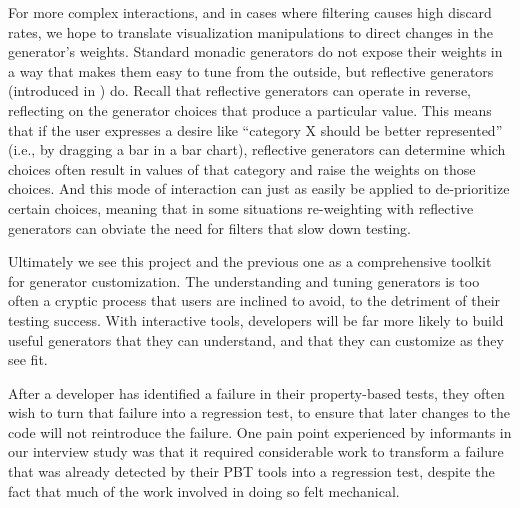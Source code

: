 For more complex interactions, and in cases where filtering causes high discard
rates, we hope to translate visualization manipulations to direct changes in the
generator's weights. Standard monadic generators do not expose their weights
in a way that makes them easy to tune from the outside, but reflective
generators (introduced in ) do. Recall that reflective
generators can operate in reverse, reflecting on the generator choices that
produce a particular value.  This means that if the user expresses a desire like
``category X should be better represented'' (i.e., by dragging a bar in a bar
chart), reflective generators can determine which choices often result in values
of that category and raise the weights on those choices. And this mode of
interaction can just as easily be applied to de-prioritize certain choices,
meaning that in some situations re-weighting with reflective generators can
obviate the need for filters that slow down testing.

Ultimately we see this project and the previous one as a comprehensive toolkit
for generator customization. The understanding and tuning generators is too
often a cryptic process that users are inclined to avoid, to the detriment of
their testing success. With interactive tools, developers will be far more
likely to build useful generators that they can understand, and that they can
customize as they see fit.



After a developer has identified a failure in their
property-based tests, they often wish to turn that failure
into a regression test, to ensure that later changes to the
code will not reintroduce the failure. One pain point
experienced by informants in our interview study was that it
required considerable work to transform a failure that was
already detected by their PBT tools into a regression test,
despite the fact that much of the work involved in doing so
felt mechanical.


